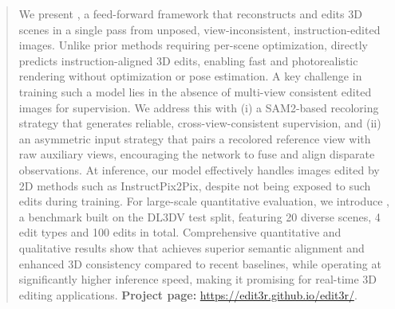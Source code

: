 \begin{abstract}
%
We present \textbf{\ourmethod}, a feed-forward framework that reconstructs and edits 3D scenes in a single pass from unposed, view-inconsistent, instruction-edited images.
%
Unlike prior methods requiring per-scene optimization, {\ourmethod} directly predicts instruction-aligned 3D edits, enabling fast and photorealistic rendering without optimization or pose estimation.
%
A key challenge in training such a model lies in the absence of multi-view consistent edited images for supervision. We address this with (i) a SAM2-based recoloring strategy that generates reliable, cross-view-consistent supervision, and (ii) an asymmetric input strategy that pairs a recolored reference view with raw auxiliary views, encouraging the network to fuse and align disparate observations.
%
At inference, our model effectively handles images edited by 2D methods such as InstructPix2Pix, despite not being exposed to such edits during training.
%
For large-scale quantitative evaluation, we introduce \textbf{{\ourbench}}, a benchmark built on the DL3DV test split, featuring 20 diverse scenes, 4 edit types and 100 edits in total.
%
Comprehensive quantitative and qualitative results show that {\ourmethod} achieves superior semantic alignment and enhanced 3D consistency compared to recent baselines, while operating at significantly higher inference speed, making it promising for real-time 3D editing applications.
\textbf{Project page:} \url{https://edit3r.github.io/edit3r/}.
\end{abstract}


